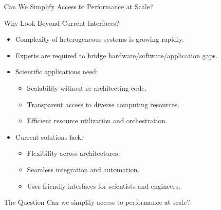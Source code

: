 \documentclass[10pt,aspectratio=1609]{beamer}
\begin{document}
\begin{section}{Can We Simplify Access to Performance at Scale?}
 \begin{frame}{Why Look Beyond Current Interfaces?}
   \begin{itemize}
     \item Complexity of heterogeneous systems is growing rapidly.
     \item Experts are required to bridge hardware/software/application gaps.
     \item Scientific applications need:
           \begin{itemize}
             \item Scalability without re-architecting code.
             \item Transparent access to diverse computing resources.
             \item Efficient resource utilization and orchestration.
           \end{itemize}
     \item Current solutions lack:
           \begin{itemize}
             \item Flexibility across architectures.
             \item Seamless integration and automation.
             \item User-friendly interfaces for scientists and engineers.
           \end{itemize}
   \end{itemize}
   \pause
   \begin{block}{The Question}
     Can we simplify access to performance at scale?
   \end{block}
 \end{frame}
\end{section}
\end{document}
